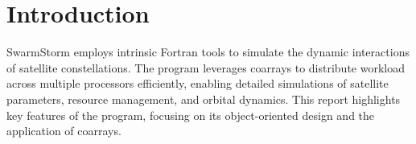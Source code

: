 % 

\section{Introduction}
SwarmStorm employs intrinsic Fortran tools to simulate the dynamic interactions of satellite constellations. The program leverages coarrays to distribute workload across multiple processors efficiently, enabling detailed simulations of satellite parameters, resource management, and orbital dynamics. This report highlights key features of the program, focusing on its object-oriented design and the application of coarrays.

\endinput  %
